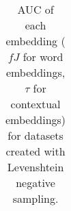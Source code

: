 \documentclass[letterpaper]{article} %
\begin{document}
\begin{table}[h]
\begin{tabular}{l l l l l l l l l l l}
    \end{tabular}     
    \caption{AUC of each embedding ($fJ$ for word embeddings, $\tau$ for contextual embeddings) for datasets created with Levenshtein negative sampling.}
    \label{tab:newDatasets_auc_negL} 
\end{table}
\end{document}
